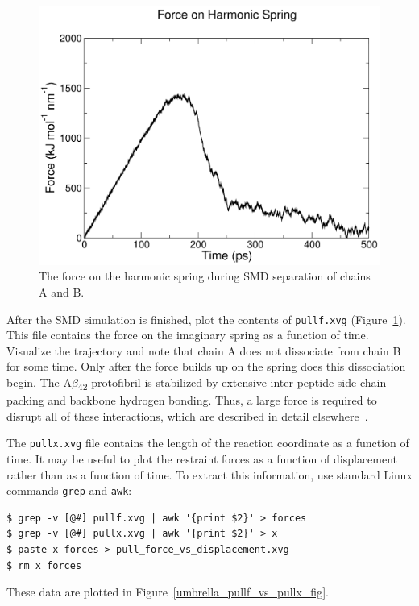 \documentclass[9pt,tutorial]{livecoms}
\begin{document}
\begin{figure}[ht!]
\centering
\includegraphics{umbrella_smd_pullf}
\caption{The force on the harmonic spring during SMD separation of chains A and B.}
\label{umbrella_smd_pullf_fig}
\end{figure}

After the SMD simulation is finished, plot the contents of \texttt{pullf.xvg} (Figure~\ref{umbrella_smd_pullf_fig}). This file contains the force on the imaginary spring as a function of time. Visualize the trajectory and note that chain A does not dissociate from chain B for some time. Only after the force builds up on the spring does this dissociation begin. The A$\beta$\textsubscript{42} protofibril is stabilized by extensive inter-peptide side-chain packing and backbone hydrogen bonding. Thus, a large force is required to disrupt all of these interactions, which are described in detail elsewhere~\cite{Lemkul2010}.

The \texttt{pullx.xvg} file contains the length of the reaction coordinate as a function of time. It may be useful to plot the restraint forces as a function of displacement rather than as a function of time. To extract this information, use standard Linux commands \texttt{grep} and \texttt{awk}:

\begin{verbatim}
$ grep -v [@#] pullf.xvg | awk '{print $2}' > forces
$ grep -v [@#] pullx.xvg | awk '{print $2}' > x
$ paste x forces > pull_force_vs_displacement.xvg
$ rm x forces
\end{verbatim}

These data are plotted in Figure~\ref{umbrella_pullf_vs_pullx_fig}.
\end{document}
